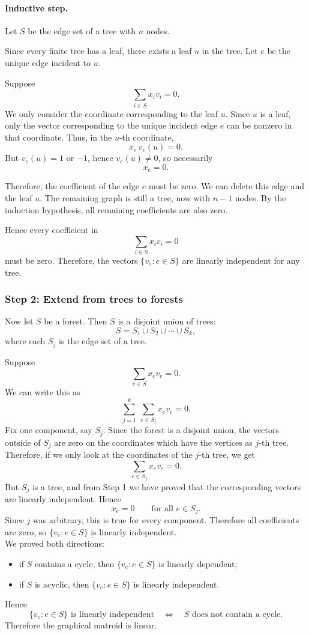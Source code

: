 \documentclass[11pt]{article}
\begin{document}
\paragraph{Inductive step.}
Let $S$ be the edge set of a tree with $n$ nodes.

Since every finite tree has a leaf, there exists a leaf $u$ in the tree. Let $e$ be the unique edge incident to $u$.

Suppose
\[
\sum_{i\in S} x_i v_i=0.
\]
We only consider the coordinate corresponding to the leaf $u$. Since $u$ is a leaf, only the vector corresponding to the unique incident edge $e$ can be nonzero in that coordinate. Thus, in the $u$-th coordinate,
\[
x_e\, v_e(u)=0.
\]
But $v_e(u)=1$ or $-1$, hence $v_e(u)\neq 0$, so necessarily
\[
x_e=0.
\]

Therefore, the coefficient of the edge $e$ must be zero. We can delete this edge and the leaf $u$. The remaining graph is still a tree, now with $n-1$ nodes. By the induction hypothesis, all remaining coefficients are also zero.

Hence every coefficient in
\[
\sum_{i\in S} x_i v_i=0
\]
must be zero. Therefore, the vectors $\{v_e:e\in S\}$ are linearly independent for any tree.

\subsubsection*{Step 2: Extend from trees to forests}

Now let $S$ be a forest. Then $S$ is a disjoint union of trees:
\[
S=S_1\cup S_2\cup\cdots\cup S_k,
\]
where each $S_j$ is the edge set of a tree.

Suppose
\[
\sum_{e\in S} x_e v_e=0.
\]
We can write this as
\[
\sum_{j=1}^k\ \sum_{e\in S_j} x_e v_e=0.
\]
Fix one component, say $S_j$. Since the forest is a disjoint union, the vectors outside of $S_j$ are zero on the coordinates which have the vertices as $j$-th tree. Therefore, if we only look at the coordinates of the $j$-th tree, we get
\[
\sum_{e\in S_j} x_e v_e=0.
\]
But $S_j$ is a tree, and from Step 1 we have proved that the corresponding vectors are linearly independent. Hence
\[
x_e=0\qquad \text{for all } e\in S_j.
\]
Since $j$ was arbitrary, this is true for every component. Therefore all coefficients are zero, so $\{v_e:e\in S\}$ is linearly independent.
\\
We proved both directions:

\begin{itemize}[leftmargin=2em]
    \item if $S$ contains a cycle, then $\{v_e:e\in S\}$ is linearly dependent;
    \item if $S$ is acyclic, then $\{v_e:e\in S\}$ is linearly independent.
\end{itemize}
Hence
\[
\{v_e:e\in S\}\text{ is linearly independent}
\quad\Longleftrightarrow\quad
S\text{ does not contain a cycle}.
\]
Therefore the graphical matroid is linear.
\end{document}
